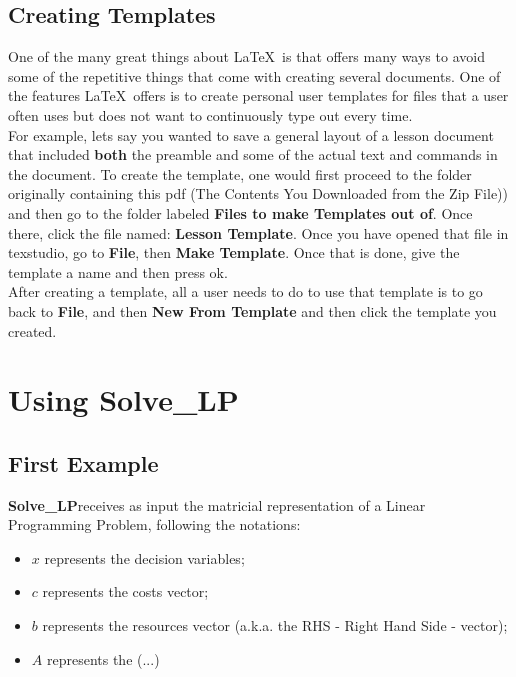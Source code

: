 \documentclass[12pt,hidelinks]{article}
\newcommand{\SolveLP}{\textbf{Solve\_LP}}
\begin{document}
	\subsection{Creating Templates}
		One of the many great things about \LaTeX\ is that offers many ways to avoid some of the repetitive things that come with creating several documents. One of the features \LaTeX\ offers is to create personal user templates for files that a user often uses but does not want to continuously type out every time.\\
		For example, lets say you wanted to save a general layout of a lesson document that included \textbf{both} the preamble and some of the actual text and commands in the document. 
		To create the template, one would first proceed to the folder originally containing this pdf (The Contents You Downloaded from the Zip File)) and then go to the folder labeled \textbf{Files to make Templates out of}. Once there, click the file named: \textbf{Lesson Template}. Once you have opened that file in texstudio, go to \textbf{File}, then \textbf{Make Template}. Once that is done, give the template a name and then press ok.\\
		After creating a template, all a user needs to do to use that template is to go back to \textbf{File}, and then \textbf{New From Template} and then click the template you created.
	\vspace{-1.5mm}
\newpage

\section{Using \SolveLP}
\label{section:usage}
\vspace{10.5cm}
	\subsection{First Example}
		\SolveLP receives as input the matricial representation of a Linear Programming Problem, following the notations:

		\begin{itemize}
			\item $x$ represents the decision variables;
			\item $c$ represents the costs vector;
			\item $b$ represents the resources vector (a.k.a. the RHS - Right Hand Side - vector);
			\item $A$ represents the (...)
		\end{itemize}
\end{document}
